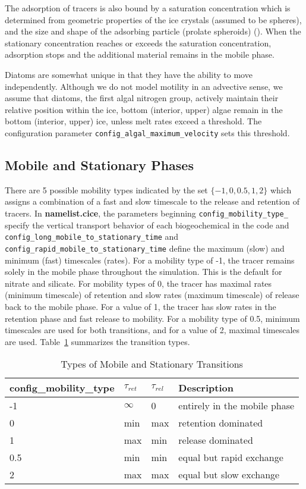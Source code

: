 The adsorption of tracers is also bound by a saturation concentration which is determined from geometric properties of the ice crystals (assumed to be spheres), and the size and shape of the adsorbing particle (prolate spheroids)  (\cite{Johnson:bac:1995}).  When the stationary concentration reaches or exceeds the saturation concentration, adsorption stops and the additional material remains in the mobile phase.

Diatoms are somewhat unique in that they have the ability to move independently. Although we do not model motility in an advective sense, we assume that diatoms, the first
algal nitrogen group, actively maintain their
relative position within the ice, \bgcie bottom (interior, upper) algae
remain in the bottom (interior, upper) ice, unless melt rates exceed a
threshold.  The configuration parameter {\tt config\_algal\_maximum\_velocity} sets this
threshold. 

\subsection{Mobile and Stationary Phases}
\label{sec:mobile_and_stationary}
There are 5 possible mobility types indicated by the set $\{-1, 0,
0.5, 1, 2\}$ which assigns a combination of a fast and slow timescale
to the release and retention of tracers.  In {\bf namelist.cice}, the
parameters beginning {\tt config\_mobility\_type\_} specify the
vertical transport behavior of each biogeochemical in the code and
{\tt config\_long\_mobile\_to\_stationary\_time} and \newline
{\tt config\_rapid\_mobile\_to\_stationary\_time} define the maximum (slow) and minimum (fast)  timescales (rates).  For a mobility type of -1, the tracer remains solely in the mobile
phase throughout the simulation.  This is the default for nitrate and silicate.  For mobility types of 0, the tracer has maximal rates (\bgcie minimum timescale) of retention and slow rates (\bgcie maximum timescale) of release back to the mobile phase.  For a value of 1, the tracer has slow rates in
the retention phase and fast release to mobility.  For a mobility type of 0.5, 
minimum timescales are used for both
transitions, and for a value of 2, maximal timescales are used. Table~\ref{table:phases} summarizes the transition types.

\begin{table}[t!]
\caption{Types of Mobile and Stationary Transitions}
\begin{tabular}{l|l|l|l} \hline 
{\bf{config\_mobility\_type}} &$ \tau_{ret}$ & $\tau_{rel}$ & Description \\ \hline 
-1  & $\infty$ & 0 & entirely in the mobile phase \\
0   & min & max & retention dominated \\
1   & max & min & release dominated \\
0.5   & min & min & equal but rapid exchange \\
2  & max & max & equal but slow exchange \\
\hline
\end{tabular}\label{table:phases}
\end{table}

